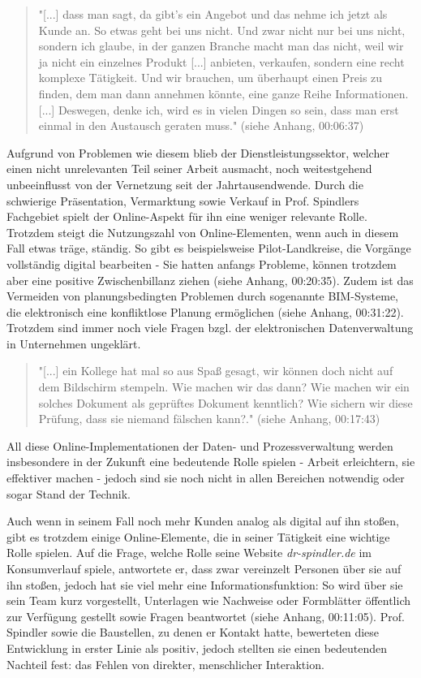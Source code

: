 \documentclass[a4paper, 12pt]{scrartcl}
\makeatletter
\newenvironment{folding}{\endgroup}{\begingroup \def \@currenvir{folding}\edef \@currenvline{\on@line}}
\makeatother
\begin{document}
\begin{folding}
\begin{quote}
"[...] dass man sagt, da gibt's ein Angebot und das nehme ich jetzt als Kunde an. So etwas geht bei uns nicht. Und zwar nicht nur bei uns nicht, sondern ich glaube, in der ganzen Branche macht man das nicht, weil wir ja nicht ein einzelnes Produkt [...] anbieten, verkaufen, sondern eine recht komplexe Tätigkeit. Und wir brauchen, um überhaupt einen Preis zu finden, dem man dann annehmen könnte, eine ganze Reihe Informationen. [...] Deswegen, denke ich, wird es in vielen Dingen so sein, dass man erst einmal in den Austausch geraten muss." (siehe Anhang, 00:06:37)
\end{quote} 
Aufgrund von Problemen wie diesem blieb der Dienstleistungssektor, welcher einen nicht unrelevanten Teil seiner Arbeit ausmacht, noch weitestgehend unbeeinflusst von der Vernetzung seit der Jahrtausendwende. Durch die schwierige Präsentation, Vermarktung sowie Verkauf in Prof. Spindlers Fachgebiet spielt der Online-Aspekt für ihn eine weniger relevante Rolle. Trotzdem steigt die Nutzungszahl von Online-Elementen, wenn auch in diesem Fall etwas träge, ständig. So gibt es beispielsweise Pilot-Landkreise, die Vorgänge vollständig digital bearbeiten - Sie hatten anfangs Probleme, können trotzdem aber eine positive Zwischenbillanz ziehen (siehe Anhang, 00:20:35). Zudem ist das Vermeiden von planungsbedingten Problemen durch sogenannte \ac{BIM}-Systeme, die elektronisch eine konfliktlose Planung ermöglichen (siehe Anhang, 00:31:22). Trotzdem sind immer noch viele Fragen bzgl. der elektronischen Datenverwaltung in Unternehmen ungeklärt.

\begin{quote}
"[...] ein Kollege hat mal so aus Spaß gesagt, wir können doch nicht auf dem Bildschirm stempeln. Wie machen wir das dann? Wie machen wir ein solches Dokument als geprüftes Dokument kenntlich? Wie sichern wir diese Prüfung, dass sie niemand fälschen kann?." (siehe Anhang, 00:17:43)
\end{quote} 
All diese Online-Implementationen der Daten- und Prozessverwaltung werden insbesondere in der Zukunft eine bedeutende Rolle spielen - Arbeit erleichtern, sie effektiver machen - jedoch sind sie noch nicht in allen Bereichen notwendig oder sogar Stand der Technik.

Auch wenn in seinem Fall noch mehr Kunden analog als digital auf ihn stoßen, gibt es trotzdem einige Online-Elemente, die in seiner Tätigkeit eine wichtige Rolle spielen. Auf die Frage, welche Rolle seine Website \emph{dr-spindler.de} im Konsumverlauf spiele, antwortete er, dass zwar vereinzelt Personen über sie auf ihn stoßen, jedoch hat sie viel mehr eine Informationsfunktion: So wird über sie sein Team kurz vorgestellt, Unterlagen wie Nachweise oder Formblätter öffentlich zur Verfügung gestellt sowie Fragen beantwortet (siehe Anhang, 00:11:05). Prof. Spindler sowie die Baustellen, zu denen er Kontakt hatte, bewerteten diese Entwicklung in erster Linie als positiv, jedoch stellten sie einen bedeutenden Nachteil fest: das Fehlen von direkter, menschlicher Interaktion. 

\end{folding}
\end{document}
